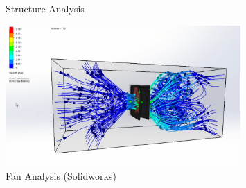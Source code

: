 \documentclass[10pt, letterpaper]{article}
\begin{document}
\begin{figure}[!b]
\begin{minipage}[c]{0.33\linewidth}
            \caption{Structure Analysis}
        \end{minipage}%
        \begin{minipage}[c]{0.33\linewidth}
            \centering
            \includegraphics[width=0.8\textwidth]{fig/SGS Intern/Fan analylsis.png}
            \caption{Fan Analysis (Solidworks)}
        \end{minipage}

        \vspace{0.1 cm}


\end{figure}
\end{document}
